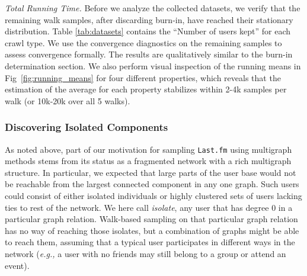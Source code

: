 \documentclass[10pt, conference]{./IEEEtran}
\newcommand{\eg}{{\em e.g., }}
\newcommand{\lastfm}{{\tt Last.fm}\xspace}
\begin{document}
{\em Total Running Time.} Before we analyze the collected datasets, we verify that the remaining walk samples, after discarding burn-in, have reached their stationary distribution. Table \ref{tab:datasets} contains the ``Number of users kept'' for each crawl type. We use the convergence diagnostics on the remaining samples to assess convergence formally. The results are qualitatively similar to the burn-in determination section. We also perform visual inspection of the running means  in Fig~\ref{fig:running_means} for four different properties, which reveals that the  estimation of the average for each property  stabilizes within 2-4k samples per walk (or 10k-20k over all 5 walks).


\subsubsection{Discovering Isolated Components}

%
%

As noted above, part of our motivation for sampling \lastfm using multigraph methods stems from its status as a fragmented network with a rich multigraph structure.  In particular, we expected that large parts of the user base would not be reachable from the largest connected component in any one graph.  Such users could consist of either isolated individuals or highly clustered sets of users lacking ties to rest of the network. We here call {\em isolate}, any user that has degree 0 in a particular graph relation. Walk-based sampling on that particular graph relation has no way of reaching those isolates, but a combination of graphs might be able to reach them, assuming that a typical user participates in different ways in the network (\eg a user with no friends may still belong to a group or attend an event).
\end{document}
